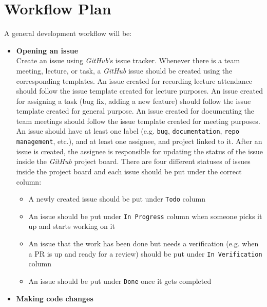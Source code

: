 \documentclass{article}
\begin{document}
\section{Workflow Plan}
        A general development workflow will be: \
\begin{itemize}
        \item \textbf{Opening an issue} \\

        Create an issue using \textit{GitHub}'s issue tracker. Whenever there is a team meeting, lecture, or task, a \textit{GitHub} issue should be created using the corresponding templates. An issue created for recording lecture attendance should follow the issue template created for lecture purposes. An issue created for assigning a task (bug fix, adding a new feature) should follow the issue template created for general purpose. An issue created for documenting the team meetings should follow the issue template created for meeting purposes. An issue should have at least one label (e.g. \texttt{bug}, \texttt{documentation}, \texttt{repo management}, etc.), and at least one assignee, and project linked to it. After an issue is created, the assignee is responsible for updating the status of the issue inside the \textit{GitHub} project board. There are four different statuses of issues inside the project board and each issue should be put under the correct column:
            \begin{itemize}
                \item A newly created issue should be put under \texttt{Todo} column
                \item An issue should be put under \texttt{In Progress} column when someone picks it up and starts working on it
                \item An issue that the work has been done but needs a verification (e.g. when a PR is up and ready for a review) should be put under \texttt{In Verification} column
                \item  An issue should be put under \texttt{Done} once it gets completed
            \end{itemize}
        \item \textbf{Making code changes} \\


\end{itemize}
\end{document}
